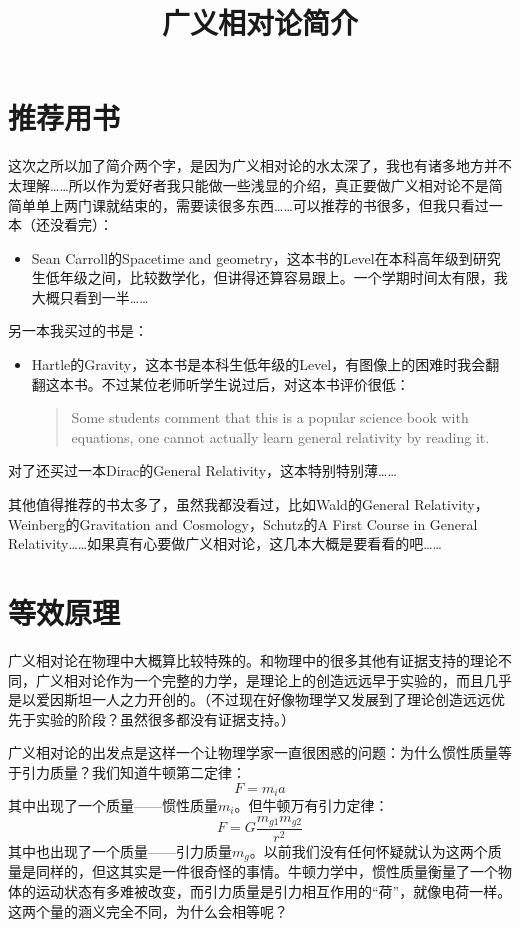 \documentclass{ctexart}
\begin{document}
\title{广义相对论简介}
\maketitle
\tableofcontents
\section{推荐用书}

这次之所以加了简介两个字，是因为广义相对论的水太深了，我也有诸多地方并不太理解……所以作为爱好者我只能做一些浅显的介绍，真正要做广义相对论不是简简单单上两门课就结束的，需要读很多东西……可以推荐的书很多，但我只看过一本（还没看完）：
\begin{itemize}
\item Sean Carroll的Spacetime and geometry，这本书的Level在本科高年级到研究生低年级之间，比较数学化，但讲得还算容易跟上。一个学期时间太有限，我大概只看到一半……
\end{itemize}
另一本我买过的书是：
\begin{itemize}
\item Hartle的Gravity，这本书是本科生低年级的Level，有图像上的困难时我会翻翻这本书。不过某位老师听学生说过后，对这本书评价很低：
\begin{quotation}
Some students comment that this is a popular science book with equations, one cannot actually learn general relativity by reading it.
\end{quotation}
\end{itemize}

对了还买过一本Dirac的General Relativity，这本特别特别薄……

其他值得推荐的书太多了，虽然我都没看过，比如Wald的General Relativity，Weinberg的Gravitation and Cosmology，Schutz的A First Course in General Relativity……如果真有心要做广义相对论，这几本大概是要看看的吧……

\section{等效原理}
广义相对论在物理中大概算比较特殊的。和物理中的很多其他有证据支持的理论不同，广义相对论作为一个完整的力学，是理论上的创造远远早于实验的，而且几乎是以爱因斯坦一人之力开创的。（不过现在好像物理学又发展到了理论创造远远优先于实验的阶段？虽然很多都没有证据支持。）

广义相对论的出发点是这样一个让物理学家一直很困惑的问题：为什么惯性质量等于引力质量？我们知道牛顿第二定律：
\begin{equation}
F=m_ia
\end{equation}
其中出现了一个质量——惯性质量$m_i$。但牛顿万有引力定律：
\begin{equation}
F=G\frac{m_{g1}m_{g2}}{r^2}
\end{equation}
其中也出现了一个质量——引力质量$m_g$。以前我们没有任何怀疑就认为这两个质量是同样的，但这其实是一件很奇怪的事情。牛顿力学中，惯性质量衡量了一个物体的运动状态有多难被改变，而引力质量是引力相互作用的“荷”，就像电荷一样。这两个量的涵义完全不同，为什么会相等呢？
\end{document}
